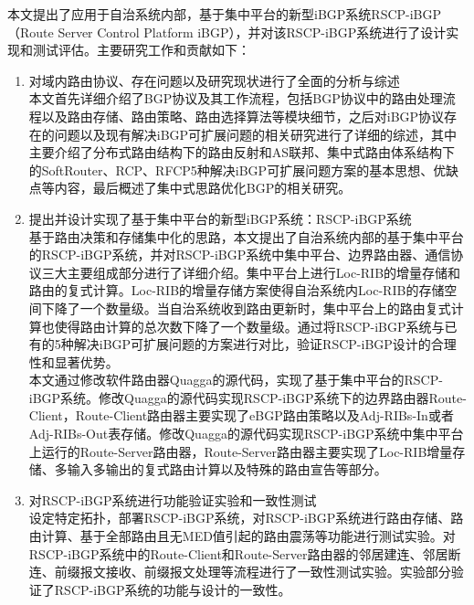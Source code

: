 本文提出了应用于自治系统内部，基于集中平台的新型iBGP系统RSCP-iBGP（Route Server Control Platform iBGP），并对该RSCP-iBGP系统进行了设计实现和测试评估。主要研究工作和贡献如下：
\begin{enumerate}
\item 对域内路由协议、存在问题以及研究现状进行了全面的分析与综述\\
\hspace*{2em}本文首先详细介绍了BGP协议及其工作流程，包括BGP协议中的路由处理流程以及路由存储、路由策略、路由选择算法等模块细节，之后对iBGP协议存在的问题以及现有解决iBGP可扩展问题的相关研究进行了详细的综述，其中主要介绍了分布式路由结构下的路由反射和AS联邦、集中式路由体系结构下的SoftRouter、RCP、RFCP5种解决iBGP可扩展问题方案的基本思想、优缺点等内容，最后概述了集中式思路优化BGP的相关研究。

\item 提出并设计实现了基于集中平台的新型iBGP系统：RSCP-iBGP系统\\
\hspace*{2em}基于路由决策和存储集中化的思路，本文提出了自治系统内部的基于集中平台的RSCP-iBGP系统，并对RSCP-iBGP系统中集中平台、边界路由器、通信协议三大主要组成部分进行了详细介绍。集中平台上进行Loc-RIB的增量存储和路由的复式计算。Loc-RIB的增量存储方案使得自治系统内Loc-RIB的存储空间下降了一个数量级。当自治系统收到路由更新时，集中平台上的路由复式计算也使得路由计算的总次数下降了一个数量级。通过将RSCP-iBGP系统与已有的5种解决iBGP可扩展问题的方案进行对比，验证RSCP-iBGP设计的合理性和显著优势。\\
\hspace*{2em}本文通过修改软件路由器Quagga的源代码，实现了基于集中平台的RSCP-iBGP系统。修改Quagga的源代码实现RSCP-iBGP系统下的边界路由器Route-Client，Route-Client路由器主要实现了eBGP路由策略以及Adj-RIBs-In或者Adj-RIBs-Out表存储。修改Quagga的源代码实现RSCP-iBGP系统中集中平台上运行的Route-Server路由器，Route-Server路由器主要实现了Loc-RIB增量存储、多输入多输出的复式路由计算以及特殊的路由宣告等部分。

\item 对RSCP-iBGP系统进行功能验证实验和一致性测试 \\
\hspace*{2em}设定特定拓扑，部署RSCP-iBGP系统，对RSCP-iBGP系统进行路由存储、路由计算、基于全部路由且无MED值引起的路由震荡等功能进行测试实验。对RSCP-iBGP系统中的Route-Client和Route-Server路由器的邻居建连、邻居断连、前缀报文接收、前缀报文处理等流程进行了一致性测试实验。实验部分验证了RSCP-iBGP系统的功能与设计的一致性。
\end{enumerate}



